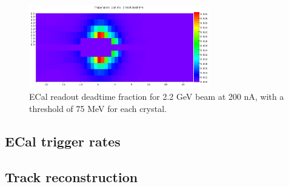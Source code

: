 \begin{figure}[ht]
	\includegraphics[width=0.7\textwidth]{performance/ecal_deadtime_22}
	\caption{\small{ECal readout deadtime fraction for 2.2 GeV beam at 200 nA, 
with a threshold of 75 MeV for each crystal.}}
	\label{fig:ecal_deadtime}
\end{figure}

\subsection{ECal trigger rates}




\subsection{Track reconstruction}




